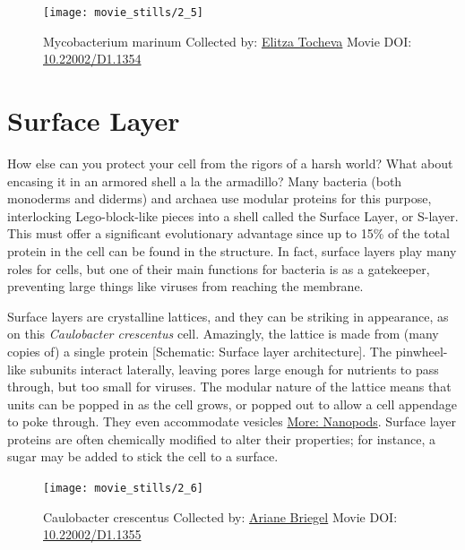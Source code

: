 \documentclass[]{tufte-book}
\begin{document}
\begin{figure}
\texttt{[image: movie\_stills/2\_5]} \caption[Mycobacterium marinum Collected by:
\protect\hyperlink{elitza_tocheva}{Elitza Tocheva} Movie DOI:
\href{https://doi.org/10.22002/D1.1354}{10.22002/D1.1354}]{Mycobacterium marinum Collected by:
\protect\hyperlink{elitza_tocheva}{Elitza Tocheva} Movie DOI:
\href{https://doi.org/10.22002/D1.1354}{10.22002/D1.1354}}\label{fig:2-5}
\end{figure}

\section{Surface Layer}\label{surface-layer}

How else can you protect your cell from the rigors of a harsh world?
What about encasing it in an armored shell a la the armadillo? Many
bacteria (both monoderms and diderms) and archaea use modular proteins
for this purpose, interlocking Lego-block-like pieces into a shell
called the Surface Layer, or S-layer. This must offer a significant
evolutionary advantage since up to 15\% of the total protein in the cell
can be found in the structure. In fact, surface layers play many roles
for cells, but one of their main functions for bacteria is as a
gatekeeper, preventing large things like viruses from reaching the
membrane.

Surface layers are crystalline lattices, and they can be striking in
appearance, as on this \emph{Caulobacter crescentus} cell. Amazingly,
the lattice is made from (many copies of) a single protein {[}Schematic:
Surface layer architecture{]}. The pinwheel-like subunits interact
laterally, leaving pores large enough for nutrients to pass through, but
too small for viruses. The modular nature of the lattice means that
units can be popped in as the cell grows, or popped out to allow a cell
appendage to poke through. They even accommodate vesicles
\protect\hyperlink{Nanopods}{More: Nanopods}. Surface layer proteins are
often chemically modified to alter their properties; for instance, a
sugar may be added to stick the cell to a surface.





\begin{figure}
\texttt{[image: movie\_stills/2\_6]} \caption[Caulobacter crescentus Collected by:
\protect\hyperlink{ariane_briegel}{Ariane Briegel} Movie DOI:
\href{https://doi.org/10.22002/D1.1355}{10.22002/D1.1355}]{Caulobacter crescentus Collected by:
\protect\hyperlink{ariane_briegel}{Ariane Briegel} Movie DOI:
\href{https://doi.org/10.22002/D1.1355}{10.22002/D1.1355}}\label{fig:2-6}
\end{figure}
\end{document}
